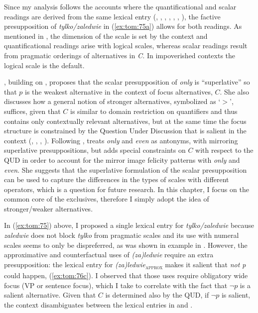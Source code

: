 \documentclass[output=paper,colorlinks,citecolor=brown]{langscibook}
\begin{document}
Since my analysis follows the accounts where the quantificational and scalar readings are derived from the same lexical entry (\citealt{bonomicasalegno93}, \citealt{vanrooij02}, \citealt{beaver04}, \citealt{klinedinst05}, \citealt{riester06}, \citealt{beaverclark08}, \citealt{coppockbeaver10, coppockbeaver14}), the factive presupposition of \textit{tylko/zaledwie} in (\ref{ex:tom:75a}) allows for both readings. As mentioned in , the dimension of the scale is set by the context and  quantificational readings arise with logical scales, whereas scalar readings result from pragmatic orderings of alternatives in \textit{C.} In impoverished contexts the logical scale is the default.

\citet{greenberg22}, building on \citet{guerzoni03}, proposes that the scalar presupposition of \textit{only} is ``superlative'' so that $p$ is the weakest alternative in the context of focus alternatives, $C$. She also discusses how a general notion of stronger alternatives, symbolized as ‘$>$’, suffices, given that $C$ is similar to domain restriction on quantifiers and thus contains only contextually relevant alternatives, but at the same time the focus structure is constrained by the Question Under Discussion that is salient in the context (\citealt{rooth92}, \citealt{roberts96}, \citealt{beaverclark08}, \citealt{coppockbeaver10, coppockbeaver14}). Following \citet{guerzoni03}, \citet{greenberg22} treats \textit{only} and \textit{even} as antonyms, with mirroring superlative presuppositions, but adds special constraints on $C$ with respect to the QUD in order to account for the mirror image felicity patterns with \textit{only} and \textit{even}. She suggests that the superlative formulation of the scalar presupposition can be used to capture the differences in the types of scales with different operators, which is a question for future research. In this chapter, I focus on the common core of the exclusives, therefore I simply adopt the idea of stronger/weaker alternatives.

In (\ref{ex:tom:75}) above, I proposed a single lexical entry for \textit{tylko/zaledwie} because \textit{zaledwie} does not block \textit{tylko} from pragmatic scales and its use with numeral scales seems to only be dispreferred, as was shown in example  in . However, the approximative and counterfactual uses of \textit{(za)ledwie} require an extra presupposition: the lexical entry for \textit{(za)ledwie}\textsubscript{\textsc{approx}} makes it salient that \textit{not p} could happen, (\ref{ex:tom:76c}). I observed that those uses require obligatory wide focus (VP or sentence focus), which I take to correlate with the fact that $\neg p$ %
is a salient alternative. Given that $C$ is determined also by the QUD, if $\neg p$ %
is salient, the context disambiguates between the lexical entries in  and .
\end{document}
